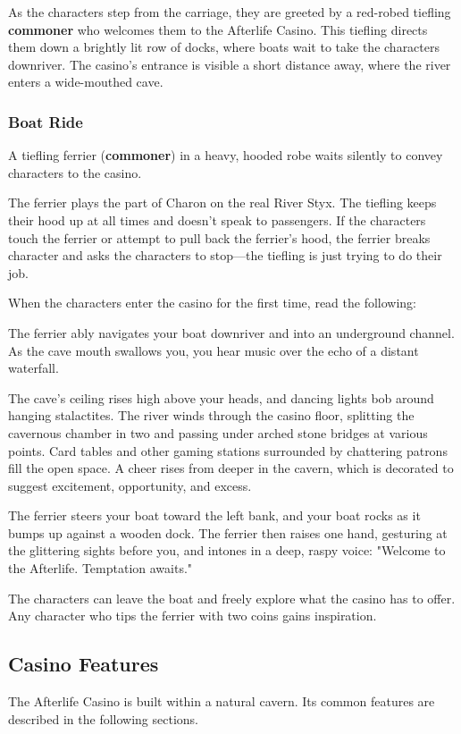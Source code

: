 \documentclass[10pt,a4paper,twoside,bg=print,twocolumn,openany,nodeprecatedcode]{dndbook}
\begin{document}
As the characters step from the carriage, they are greeted by a red-robed tiefling \textbf{commoner} who welcomes them to the Afterlife Casino. This tiefling directs them down a brightly lit row of docks, where boats wait to take the characters downriver. The casino's entrance is visible a short distance away, where the river enters a wide-mouthed cave.

\subsubsection{Boat Ride}
A tiefling ferrier (\textbf{commoner}) in a heavy, hooded robe waits silently to convey characters to the casino.

The ferrier plays the part of Charon on the real River Styx. The tiefling keeps their hood up at all times and doesn't speak to passengers. If the characters touch the ferrier or attempt to pull back the ferrier's hood, the ferrier breaks character and asks the characters to stop—the tiefling is just trying to do their job.

When the characters enter the casino for the first time, read the following:

\begin{DndReadAloud}{}
The ferrier ably navigates your boat downriver and into an underground channel. As the cave mouth swallows you, you hear music over the echo of a distant waterfall.

The cave's ceiling rises high above your heads, and dancing lights bob around hanging stalactites. The river winds through the casino floor, splitting the cavernous chamber in two and passing under arched stone bridges at various points. Card tables and other gaming stations surrounded by chattering patrons fill the open space. A cheer rises from deeper in the cavern, which is decorated to suggest excitement, opportunity, and excess.

The ferrier steers your boat toward the left bank, and your boat rocks as it bumps up against a wooden dock. The ferrier then raises one hand, gesturing at the glittering sights before you, and intones in a deep, raspy voice: "Welcome to the Afterlife. Temptation awaits."

\end{DndReadAloud}

The characters can leave the boat and freely explore what the casino has to offer. Any character who tips the ferrier with two coins gains inspiration.

\subsection{Casino Features}
The Afterlife Casino is built within a natural cavern. Its common features are described in the following sections.
\end{document}
